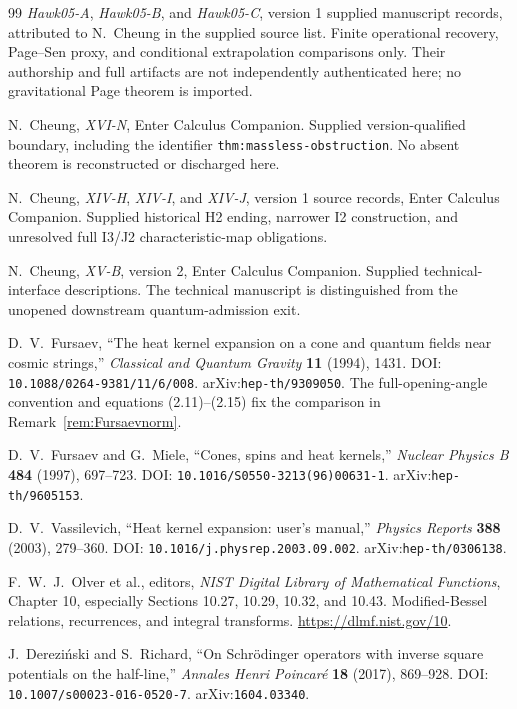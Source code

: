 \documentclass[11pt,a4paper]{article}
\newcommand{\loc}[1]{\nolinkurl{#1}}
\theoremstyle{plain}
\theoremstyle{definition}
\theoremstyle{remark}
\numberwithin{equation}{section}
\begin{document}
\begin{thebibliography}{99}
\ddag \emph{Hawk05-A}, \emph{Hawk05-B}, and \emph{Hawk05-C},
version 1 supplied manuscript records,
attributed to N.~Cheung in the supplied source list.
Finite operational recovery, Page--Sen proxy, and conditional
extrapolation comparisons only.
Their authorship and full artifacts are not independently
authenticated here; no gravitational Page theorem is imported.

\ddag N.~Cheung,
\emph{XVI-N},
Enter Calculus Companion.
Supplied version-qualified boundary, including the identifier
\loc{thm:massless-obstruction}.
No absent theorem is reconstructed or discharged here.

\ddag N.~Cheung,
\emph{XIV-H}, \emph{XIV-I}, and \emph{XIV-J},
version 1 source records, Enter Calculus Companion.
Supplied historical H2 ending, narrower I2 construction, and
unresolved full I3/J2 characteristic-map obligations.

\ddag N.~Cheung,
\emph{XV-B},
version 2, Enter Calculus Companion.
Supplied technical-interface descriptions.
The technical manuscript is distinguished from the unopened
downstream quantum-admission exit.

\dag D.~V.~Fursaev,
``The heat kernel expansion on a cone and quantum fields near
cosmic strings,''
\emph{Classical and Quantum Gravity} \textbf{11} (1994), 1431.
DOI: \nolinkurl{10.1088/0264-9381/11/6/008}.
arXiv:\nolinkurl{hep-th/9309050}.
The full-opening-angle convention and equations (2.11)--(2.15)
fix the comparison in Remark~\ref{rem:Fursaevnorm}.

\dag D.~V.~Fursaev and G.~Miele,
``Cones, spins and heat kernels,''
\emph{Nuclear Physics B} \textbf{484} (1997), 697--723.
DOI: \nolinkurl{10.1016/S0550-3213(96)00631-1}.
arXiv:\nolinkurl{hep-th/9605153}.

\dag D.~V.~Vassilevich,
``Heat kernel expansion: user's manual,''
\emph{Physics Reports} \textbf{388} (2003), 279--360.
DOI: \nolinkurl{10.1016/j.physrep.2003.09.002}.
arXiv:\nolinkurl{hep-th/0306138}.

\dag F.~W.~J.~Olver et al., editors,
\emph{NIST Digital Library of Mathematical Functions},
Chapter 10, especially Sections 10.27, 10.29, 10.32, and 10.43.
Modified-Bessel relations, recurrences, and integral transforms.
\url{https://dlmf.nist.gov/10}.

\dag J.~Derezi\'nski and S.~Richard,
``On Schr\"odinger operators with inverse square potentials on
the half-line,''
\emph{Annales Henri Poincar\'e} \textbf{18} (2017), 869--928.
DOI: \nolinkurl{10.1007/s00023-016-0520-7}.
arXiv:\nolinkurl{1604.03340}.


\end{thebibliography}
\end{document}
